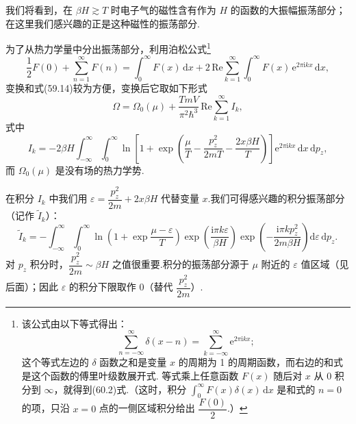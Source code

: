 我们将看到，在 $\beta H\gtrsim T$ 时电子气的磁性含有作为 $H$ 的函数的大振幅振荡部分；在这里我们感兴趣的正是这种磁性的振荡部分.

为了从热力学量中分出振荡部分，利用泊松公式\footnote{该公式由以下等式得出：
\begin{equation*}
  \sum_{n=-\infty}^{\infty}\delta(x-n)=\sum_{k=-\infty}^{\infty}\mathrm{e}^{2\pi\mathrm{i}kx};
\end{equation*}
这个等式左边的 $\delta$ 函数之和是变量 $x$ 的周期为 1 的周期函数，而右边的和式是这个函数的傅里叶级数展开式. 等式乘上任意函数 $F(x)$ 随后对 $x$ 从 0 积分到 $\infty$，就得到(60.2)式.（这时，积分 $\int_0^\infty F(x)\delta(x)\,\mathrm{d}x$ 是和式的 $n=0$ 的项，只沿 $x=0$ 点的一侧区域积分给出 $\dfrac{F(0)}{2}$.）}
\begin{equation}
  \frac{1}{2}F(0)+\sum_{n=1}^{\infty}F(n)=\int_0^{\infty}F(x)\,\mathrm{d}x
  +2\,\mathrm{Re}\sum_{k=1}^{\infty}\int_0^{\infty}F(x)\,\mathrm{e}^{2\pi\mathrm{i}kx}\,\mathrm{d}x,
\end{equation}
变换和式(59.14)较为方便，变换后它取如下形式
\begin{equation}
  \Omega=\Omega_0(\mu)+\frac{TmV}{\pi^2\hbar^3}\,\mathrm{Re}\sum_{k=1}^{\infty}I_k,
\end{equation}
式中
\begin{equation}
  I_k=-2\beta H\int_{-\infty}^{\infty}\int_0^{\infty}
  \ln\left[1+\exp\left(\frac{\mu}{T}-\frac{p_z^2}{2mT}-\frac{2x\beta H}{T}\right)\right]
  \mathrm{e}^{2\pi\mathrm{i}kx}\,\mathrm{d}x\,\mathrm{d}p_z,
\end{equation}
而 $\Omega_0(\mu)$ 是没有场的热力学势.

在积分 $I_k$ 中我们用 $\varepsilon=\dfrac{p_z^2}{2m}+2x\beta H$ 代替变量 $x$.我们可得感兴趣的积分振荡部分（记作 $\tilde{I}_k$）：
\begin{equation*}
  \tilde{I}_k=-\int_{-\infty}^{\infty}\int_0^{\infty}
  \ln\left(1+\exp\frac{\mu-\varepsilon}{T}\right)
  \exp\left(\frac{\mathrm{i}\pi k\varepsilon}{\beta H}\right)
  \exp\left(-\frac{\mathrm{i}\pi kp_z^2}{2m\beta H}\right)\mathrm{d}\varepsilon\,\mathrm{d}p_z.
\end{equation*}
对 $p_z$ 积分时，$\dfrac{p_z^2}{2m}\sim\beta H$ 之值很重要.积分的振荡部分源于 $\mu$ 附近的 $\varepsilon$ 值区域（见后面）；因此 $\varepsilon$ 的积分下限取作 0（替代 $\dfrac{p_z^2}{2m}$）.

